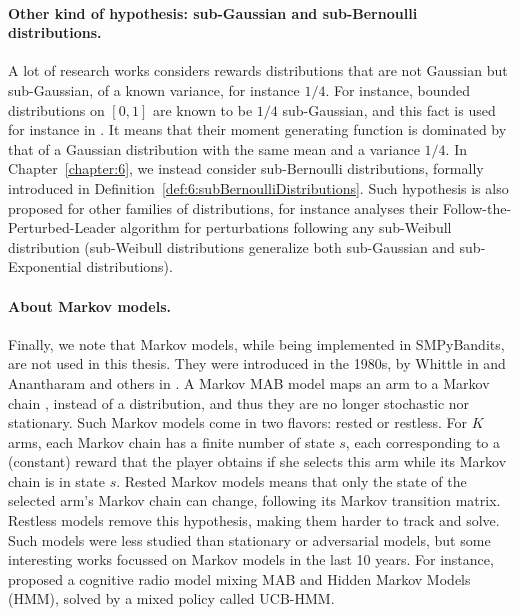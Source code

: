 \paragraph{Other kind of hypothesis: sub-Gaussian and sub-Bernoulli distributions.}
%
A lot of research works considers rewards distributions that are not Gaussian but sub-Gaussian, of a known variance, for instance $1/4$.
For instance, bounded distributions on $[0,1]$ are known to be $1/4$ sub-Gaussian, and this fact is used for instance in \cite{Maillard2018GLR}.
It means that their moment generating function is dominated by that of a Gaussian distribution with the same mean and a variance $1/4$.
In Chapter~\ref{chapter:6}, we instead consider sub-Bernoulli distributions, formally introduced in Definition~\ref{def:6:subBernoulliDistributions}.
%
Such hypothesis is also proposed for other families of distributions, for instance \cite{KimTewari2019} analyses their Follow-the-Perturbed-Leader algorithm for perturbations following any sub-Weibull distribution (sub-Weibull distributions generalize both sub-Gaussian and sub-Exponential distributions).



\paragraph{About Markov models.}
%
Finally, we note that Markov models, while being implemented in SMPyBandits, are not used in this thesis.
They were introduced in the 1980s, by Whittle in \cite{Whittle1988} and Anantharam and others in \cite{Anantharam87b}.
A Markov MAB model maps an arm to a Markov chain \cite{Norris98}, instead of a distribution, and thus they are no longer stochastic nor stationary.
Such Markov models come in two flavors: rested or restless.
For $K$ arms, each Markov chain has a finite number of state $s$, each corresponding to a (constant) reward that the player obtains if she selects this arm while its Markov chain is in state $s$.
Rested Markov models means that only the state of the selected arm's Markov chain can change, following its Markov transition matrix.
Restless models remove this hypothesis, making them harder to track and solve.
%
Such models were less studied than stationary or adversarial models, but some interesting works focussed on Markov models in the last 10 years.
For instance, \cite{Melian15} proposed a cognitive radio model mixing MAB and Hidden Markov Models (HMM), solved by a mixed policy called UCB-HMM.



